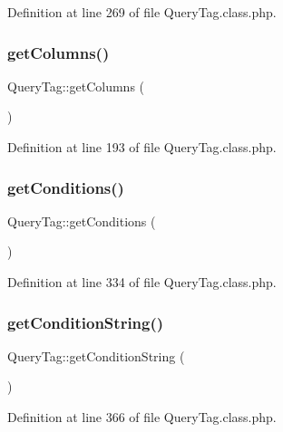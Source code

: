 Definition at line 269 of file Query\+Tag.\+class.\+php.

\mbox{\label{classQueryTag_a4909be88c35581f69baa42ec67c6a58d}} 
\subsubsection{\texorpdfstring{get\+Columns()}{getColumns()}}
{\footnotesize\ttfamily Query\+Tag\+::get\+Columns (\begin{DoxyParamCaption}{ }\end{DoxyParamCaption})}



Definition at line 193 of file Query\+Tag.\+class.\+php.

\mbox{\label{classQueryTag_a0ee36c6d269e79842fb5e234405b9e3b}} 
\subsubsection{\texorpdfstring{get\+Conditions()}{getConditions()}}
{\footnotesize\ttfamily Query\+Tag\+::get\+Conditions (\begin{DoxyParamCaption}{ }\end{DoxyParamCaption})}



Definition at line 334 of file Query\+Tag.\+class.\+php.

\mbox{\label{classQueryTag_a867e1058c082898d0d6e97a04b8901f8}} 
\subsubsection{\texorpdfstring{get\+Condition\+String()}{getConditionString()}}
{\footnotesize\ttfamily Query\+Tag\+::get\+Condition\+String (\begin{DoxyParamCaption}{ }\end{DoxyParamCaption})}



Definition at line 366 of file Query\+Tag.\+class.\+php.


